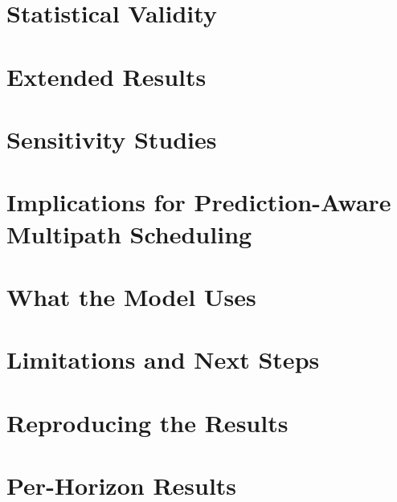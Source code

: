 \documentclass[11pt]{article}
\begin{document}
\section{Statistical Validity}
\label{sec:validity}


\section{Extended Results}
\label{sec:extended}


\section{Sensitivity Studies}
\label{sec:sensitivity}


\section{Implications for Prediction-Aware Multipath Scheduling}
\label{sec:sched}



\section{What the Model Uses}
\label{sec:attention}


\section{Limitations and Next Steps}
\label{sec:limits}


\appendix
\section{Reproducing the Results}
\label{app:repro}


\clearpage
\section{Per-Horizon Results}
\label{app:horizon}




\end{document}
